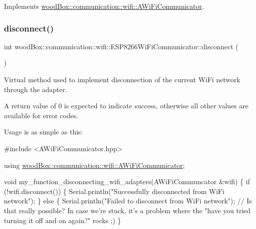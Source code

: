 Implements \mbox{\hyperlink{classwood_box_1_1communication_1_1wifi_1_1_a_wi_fi_communicator_ad8c31be391a58bfabe21c5ef99a94719}{wood\+Box\+::communication\+::wifi\+::\+A\+Wi\+Fi\+Communicator}}.

\mbox{\label{classwood_box_1_1communication_1_1wifi_1_1_e_s_p8266_wi_fi_communicator_af30a81a7f279c11241b3df0878289af0}} 
\subsubsection{\texorpdfstring{disconnect()}{disconnect()}}
{\footnotesize\ttfamily int wood\+Box\+::communication\+::wifi\+::\+E\+S\+P8266\+Wi\+Fi\+Communicator\+::disconnect (\begin{DoxyParamCaption}{ }\end{DoxyParamCaption})\hspace{0.3cm}{\ttfamily [virtual]}}

Virtual method used to implement disconnection of the current Wi\+Fi network through the adapter.

A return value of 0 is expected to indicate success, otherwise all other values are available for error codes.

Usage is as simple as this\+:


\begin{DoxyCode}
\textcolor{preprocessor}{#include <AWiFiCommunicator.hpp>}

\textcolor{keyword}{using} \mbox{\hyperlink{classwood_box_1_1communication_1_1wifi_1_1_a_wi_fi_communicator}{woodBox::communication::wifi::AWiFiCommunicator}};

\textcolor{keywordtype}{void} my\_function\_disconnecting\_wifi\_adapters(AWiFiCommuncator &wifi) \{
  \textcolor{keywordflow}{if} (!wifi.disconnect()) \{
    Serial.println(\textcolor{stringliteral}{"Successfully disconnected from WiFi network"});
  \} \textcolor{keywordflow}{else} \{
    Serial.println(\textcolor{stringliteral}{"Failed to disconnect from WiFi network"}); \textcolor{comment}{// Is that really possible? In case we're
       stuck, it's a problem where the "have you tried turning it off and on again?" rocks ;)}
\}
\end{DoxyCode}
 

